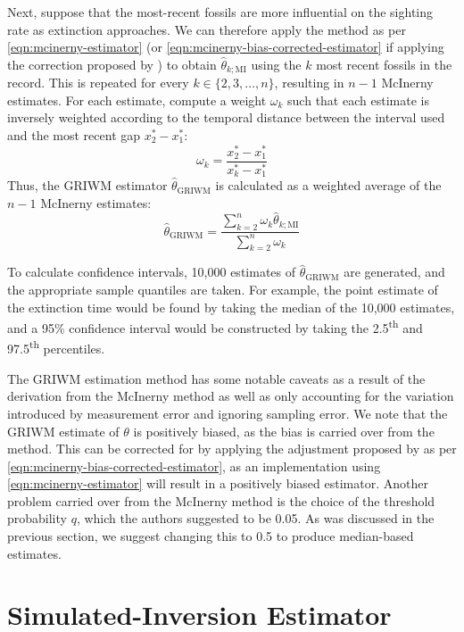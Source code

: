 Next, suppose that the most-recent fossils are more influential on the sighting rate as extinction approaches. We can therefore apply the \citet{Mcinerny2006} method as per \autoref{eqn:mcinerny-estimator} (or \autoref{eqn:mcinerny-bias-corrected-estimator} if applying the correction proposed by \citet{Huang2019}) to obtain $\hat\theta_{k; \text{MI}}$ using the $k$ most recent fossils in the record. This is repeated for every $k \in \{2, 3, \dots, n\}$, resulting in $n-1$ McInerny estimates. For each estimate, compute a weight $\omega_k$ such that each estimate is inversely weighted according to the temporal distance between the interval used and the most recent gap $x^*_{2} - x^*_{1}$: \[
\omega_k = \frac{x^*_{2} - x^*_{1}}{x^*_{k} - x^*_{1}}
\]
Thus, the GRIWM estimator $\hat\theta_{\text{GRIWM}}$ is calculated as a weighted average of the $n-1$ McInerny estimates:\begin{equation}\label{eq:griwm1}
    \hat\theta_{\text{GRIWM}} = \frac{\sum_{k=2}^{n} \omega_k \hat\theta_{k; \text{MI}}}{\sum_{k=2}^{n} \omega_k}
\end{equation}

To calculate confidence intervals, 10,000 estimates of $\hat\theta_{\text{GRIWM}}$ are generated, and the appropriate sample quantiles are taken. For example, the point estimate of the extinction time would be found by taking the median of the 10,000 estimates, and a 95\% confidence interval would be constructed by taking the 2.5\textsuperscript{th} and 97.5\textsuperscript{th} percentiles.

The GRIWM estimation method has some notable caveats as a result of the derivation from the McInerny method as well as only accounting for the variation introduced by measurement error and ignoring sampling error. We note that the GRIWM estimate of $\theta$ is positively biased, as the bias is carried over from the \citet{Mcinerny2006} method. This can be corrected for by applying the adjustment proposed by \citet{Huang2019} as per \autoref{eqn:mcinerny-bias-corrected-estimator}, as an implementation using \autoref{eqn:mcinerny-estimator} will result in a positively biased estimator. Another problem carried over from the McInerny method is the choice of the threshold probability $q$, which the authors suggested to be 0.05. As was discussed in the previous section, we suggest changing this to 0.5 to produce median-based estimates.

\section{Simulated-Inversion Estimator}

